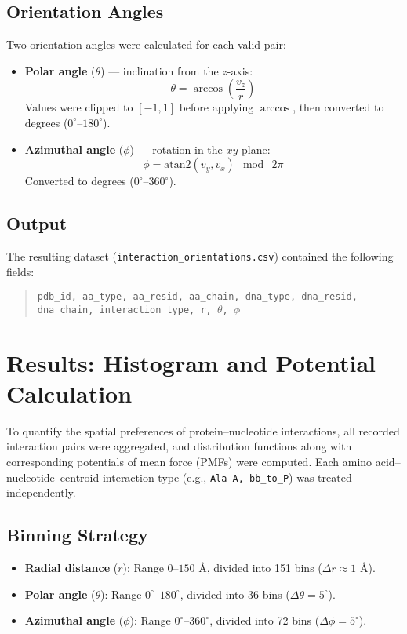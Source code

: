 \documentclass[12pt,a4paper]{report}
\begin{document}
\subsection*{Orientation Angles}
Two orientation angles were calculated for each valid pair:
\begin{itemize}
    \item \textbf{Polar angle} ($\theta$) — inclination from the $z$-axis:
    \[
    \theta = \arccos\left(\frac{v_z}{r}\right)
    \]
    Values were clipped to $[-1, 1]$ before applying $\arccos$, then converted to degrees ($0^\circ$--$180^\circ$).
    \item \textbf{Azimuthal angle} ($\phi$) — rotation in the $xy$-plane:
    \[
    \phi = \mathrm{atan2}(v_y, v_x) \ \bmod \ 2\pi
    \]
    Converted to degrees ($0^\circ$--$360^\circ$).
\end{itemize}

\subsection*{Output}
The resulting dataset (\texttt{interaction\_orientations.csv}) contained the following fields:
\begin{quote}
\texttt{pdb\_id, aa\_type, aa\_resid, aa\_chain, dna\_type, dna\_resid, dna\_chain, interaction\_type, r, $\theta$, $\phi$}
\end{quote}



\newpage
\section*{Results: Histogram and Potential Calculation}

To quantify the spatial preferences of protein--nucleotide interactions, all recorded interaction pairs were aggregated, and distribution functions along with corresponding potentials of mean force (PMFs) were computed.  
Each amino acid--nucleotide--centroid interaction type (e.g., \texttt{Ala--A, bb\_to\_P}) was treated independently.

\subsection*{Binning Strategy}
\begin{itemize}
    \item \textbf{Radial distance} ($r$): Range $0$--$150$ \AA{}, divided into 151 bins ($\Delta r \approx 1$ \AA{}).
    \item \textbf{Polar angle} ($\theta$): Range $0^\circ$--$180^\circ$, divided into 36 bins ($\Delta \theta = 5^\circ$).
    \item \textbf{Azimuthal angle} ($\phi$): Range $0^\circ$--$360^\circ$, divided into 72 bins ($\Delta \phi = 5^\circ$).
\end{itemize}
\end{document}
